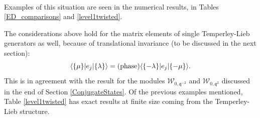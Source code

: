 \documentclass[a4paper,10pt]{article}
\newcommand{\q}{\mathfrak{q}}
\newcommand{\linnea}[1]{$\framebox{\tiny L}$\ \textbf{\texttt{{\color{red}\footnotesize#1}}}}
\newcommand{\jesper}[1]{$\framebox{\tiny J}$\ \textbf{\texttt{{\color{cyan}\footnotesize#1}}}}
\newcommand{\aSt}{\mathcal{W}}
\newcommand{\AStTL}[2]{\aSt_{#1,#2}}
\begin{document}
%
%
%
~\\
Examples of this situation are seen in the numerical results, in Tables \ref{ED_comparisons} and \ref{level1twisted}. %





The considerations above hold for the matrix elements of single Temperley-Lieb generators as well, because of translational invariance (to be discussed in the next section):
%
\begin{equation}
\langle \{\mu\} | e_j | \{\lambda\} \rangle = ({\rm phase}) \langle \{-\lambda\} | e_j | \{-\mu\} \rangle.
\end{equation}
%
This is in agreement with the result for the modules  $\AStTL{0}{\q^{-2}} $ and $\AStTL{0}{\q^{2}}$ discussed in the end of Section \ref{ConjugateStates}.
%
%
Of the previous examples mentioned, Table \ref{level1twisted} %
has exact results at finite size coming from the Temperley-Lieb structure.
 
\end{document}
